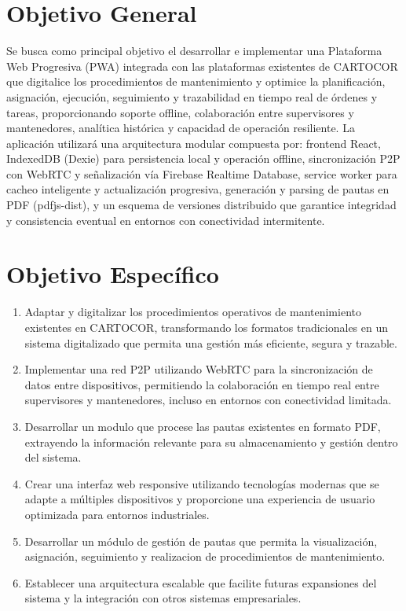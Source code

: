 \documentclass[12pt,a4paper]{report}
\begin{document}
\section*{Objetivo General}
Se busca como principal objetivo el desarrollar e implementar una Plataforma Web Progresiva (PWA) integrada con las plataformas existentes de CARTOCOR que digitalice los procedimientos de mantenimiento y optimice la planificación, asignación, ejecución, seguimiento y trazabilidad en tiempo real de órdenes y tareas, proporcionando soporte offline, colaboración entre supervisores y mantenedores, analítica histórica y capacidad de operación resiliente.
La aplicación utilizará una arquitectura modular compuesta por: frontend React, IndexedDB (Dexie) para persistencia local y operación offline, sincronización P2P con WebRTC y señalización vía Firebase Realtime Database, service worker para cacheo inteligente y actualización progresiva, generación y parsing de pautas en PDF (pdfjs-dist), y un esquema de versiones distribuido que garantice integridad y consistencia eventual en entornos con conectividad intermitente.

 
\newpage
\section*{Objetivo Específico}

\begin{enumerate}
    \item Adaptar y digitalizar los procedimientos operativos de mantenimiento existentes en CARTOCOR, transformando los formatos tradicionales en un sistema digitalizado que permita una gestión más eficiente, segura y trazable.
    \item Implementar una red P2P utilizando WebRTC para la sincronización de datos entre dispositivos, permitiendo la colaboración en tiempo real entre supervisores y mantenedores, incluso en entornos con conectividad limitada.
    \item Desarrollar un modulo que procese las pautas existentes en formato PDF, extrayendo la información relevante para su almacenamiento y gestión dentro del sistema.
    \item Crear una interfaz web responsive utilizando tecnologías modernas que se adapte a múltiples dispositivos y proporcione una experiencia de usuario optimizada para entornos industriales.
    \item Desarrollar un módulo de gestión de pautas que permita la visualización, asignación, seguimiento y realizacion de procedimientos de mantenimiento.
    \item Establecer una arquitectura escalable que facilite futuras expansiones del sistema y la integración con otros sistemas empresariales.
\end{enumerate}
\end{document}
